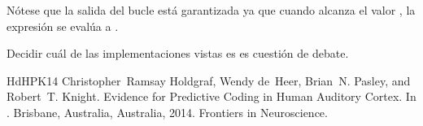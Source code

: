 \documentclass[letterpaper,10pt,english]{sphinxmanual}
\begin{document}

Nótese que la salida del bucle está garantizada ya que cuando
 alcanza el valor , la expresión 
se evalúa a .

Decidir cuál de las implementaciones vistas es  es cuestión de
debate.

\begin{sphinxthebibliography}{HdHPK14}
Christopher Ramsay Holdgraf, Wendy de Heer, Brian N. Pasley, and Robert T. Knight. Evidence for Predictive Coding in Human Auditory Cortex. In . Brisbane, Australia, Australia, 2014. Frontiers in Neuroscience.
\end{sphinxthebibliography}







\renewcommand{\indexname}{Index}
\printindex
\end{document}
